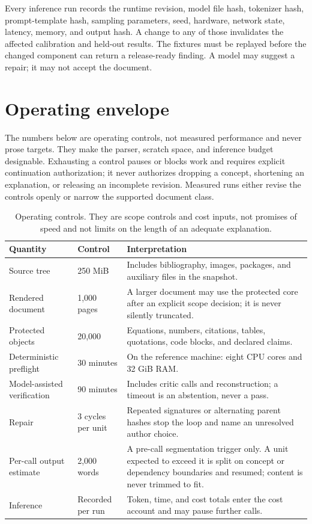 Every inference run records the runtime revision, model file hash, tokenizer
hash, prompt-template hash, sampling parameters, seed, hardware, network
state, latency, memory, and output hash. A change to any of those invalidates
the affected calibration and held-out results. The fixtures must be replayed
before the changed component can return a release-ready finding. A model may
suggest a repair; it may not accept the document.

\section{Operating envelope}
\label{sec:contract-envelope}

The numbers below are operating controls, not measured performance and never
prose targets. They make the parser, scratch space, and inference budget
designable. Exhausting a control pauses or blocks work and requires explicit
continuation authorization; it never authorizes dropping a concept, shortening an
explanation, or releasing an incomplete revision. Measured runs either revise the
controls openly or narrow the supported document class.

\begin{table}[H]
\centering
\small
\begin{tabularx}{\textwidth}{@{}p{}p{}L@{}}
\toprule
Quantity & Control & Interpretation \\
\midrule
Source tree & 250 MiB & Includes bibliography, images, packages, and auxiliary
files in the snapshot. \\
Rendered document & 1,000 pages & A larger document may use the protected core
after an explicit scope decision; it is never silently truncated. \\
Protected objects & 20,000 & Equations, numbers, citations, tables, quotations,
code blocks, and declared claims. \\
Deterministic preflight & 30 minutes & On the reference machine: eight CPU
cores and 32 GiB RAM. \\
Model-assisted verification & 90 minutes & Includes critic calls and
reconstruction; a timeout is an abstention, never a pass. \\
Repair & 3 cycles per unit & Repeated signatures or alternating parent hashes
stop the loop and name an unresolved author choice. \\
Per-call output estimate & 2,000 words & A pre-call segmentation trigger only. A
unit expected to exceed it is split on concept or dependency boundaries and
resumed; content is never trimmed to fit. \\
Inference & Recorded per run & Token, time, and cost totals enter the cost
account and may pause further calls. \\
\bottomrule
\end{tabularx}
\caption{Operating controls. They are scope controls and cost inputs, not
promises of speed and not limits on the length of an adequate explanation.}
\label{tab:contract-envelope}
\end{table}

